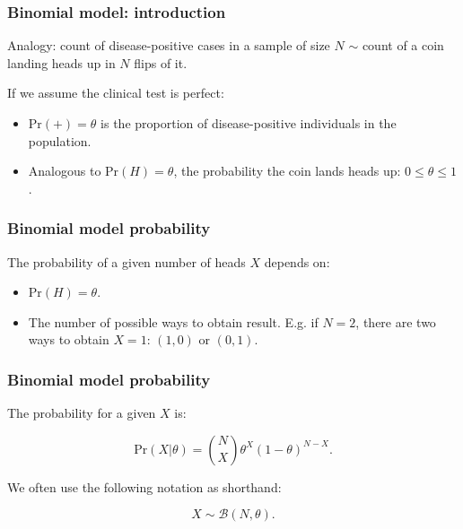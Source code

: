 \documentclass[handout]{beamer}
\begin{document}
\begin{frame}
	\frametitle{Binomial model: introduction}
	
	Analogy: count of disease-positive cases in a sample of size $N$ $\sim$ count of a coin landing heads up in $N$ flips of it.
	
	\vspace{0.2cm}
	
	If we assume the clinical test is perfect:
	
	\begin{itemize}
		\item $\text{Pr}(+) = \theta$ is the proportion of disease-positive individuals in the population.
		\item Analogous to $\text{Pr}(H) = \theta$, the probability the coin lands heads up: $0\leq \theta \leq 1$.
	\end{itemize}
	
\end{frame}

\begin{frame}
	\frametitle{Binomial model probability}
	The probability of a given number of heads $X$ depends on:
	
	\begin{itemize}
		\item $\text{Pr}(H) = \theta$.
		\item The number of possible ways to obtain result. E.g. if $N=2$, there are two ways to obtain $X=1$: $(1,0)$ or $(0,1)$.
		\end{itemize}
\end{frame}

\begin{frame}
	\frametitle{Binomial model probability}
	The probability for a given $X$ is:
	
	\begin{equation}
	\text{Pr}(X|\theta) = \binom{N}{X} \theta^X (1- \theta)^{N-X}.
	\end{equation}
	
	We often use the following notation as shorthand:
	
	\begin{equation}
	X\sim \mathcal{B}(N, \theta).
	\end{equation}
	
\end{frame}
\end{document}
